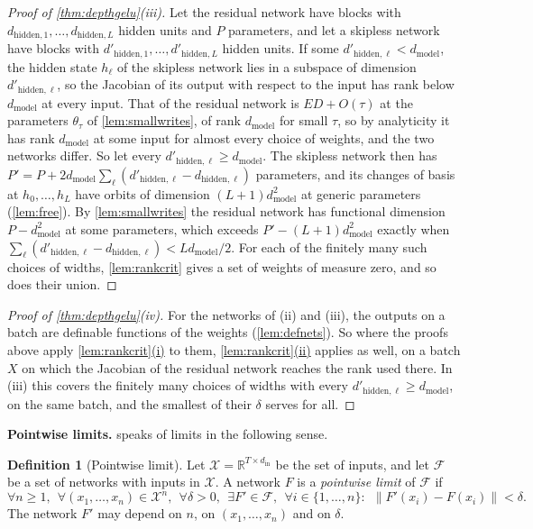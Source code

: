 \documentclass[10pt]{article}
\theoremstyle{definition}
\newtheorem{definition}[theorem]{Definition}
\theoremstyle{remark}
\newcommand{\R}{\mathbb{R}}
\newcommand{\dm}{d_{\mathrm{model}}}
\newcommand{\norm}[1]{\lVert #1\rVert}
\newcommand{\para}[1]{\smallskip\noindent\textbf{#1}\hspace{0.5em}}
\DeclareRobustCommand{\cpref}[2]{\hyperref[#1:#2]{\cref*{#1}(#2)}}
\begin{document}
\begin{proof}[Proof of \cref{thm:depthgelu}(iii)]
Let the residual network have blocks with $d_{\mathrm{hidden},1}, \dots, d_{\mathrm{hidden},L}$ hidden units and $P$ parameters, and let a skipless network have blocks with $d'_{\mathrm{hidden},1}, \dots, d'_{\mathrm{hidden},L}$ hidden units. If some $d'_{\mathrm{hidden},\ell} < \dm$, the hidden state $h_\ell$ of the skipless network lies in a subspace of dimension $d'_{\mathrm{hidden},\ell}$, so the Jacobian of its output with respect to the input has rank below $\dm$ at every input. That of the residual network is $ED + O(\tau)$ at the parameters $\theta_\tau$ of \cref{lem:smallwrites}, of rank $\dm$ for small $\tau$, so by analyticity it has rank $\dm$ at some input for almost every choice of weights, and the two networks differ. So let every $d'_{\mathrm{hidden},\ell} \ge \dm$. The skipless network then has $P' = P + 2\dm\sum_\ell(d'_{\mathrm{hidden},\ell} - d_{\mathrm{hidden},\ell})$ parameters, and its changes of basis at $h_0, \dots, h_L$ have orbits of dimension $(L+1)\dm^2$ at generic parameters (\cref{lem:free}). By \cref{lem:smallwrites} the residual network has functional dimension $P - \dm^2$ at some parameters, which exceeds $P' - (L+1)\dm^2$ exactly when $\sum_\ell(d'_{\mathrm{hidden},\ell} - d_{\mathrm{hidden},\ell}) < L\dm/2$. For each of the finitely many such choices of widths, \cref{lem:rankcrit} gives a set of weights of measure zero, and so does their union.
\end{proof}

\begin{proof}[Proof of \cref{thm:depthgelu}(iv)]
For the networks of (ii) and (iii), the outputs on a batch are definable functions of the weights (\cref{lem:defnets}). So where the proofs above apply \cpref{lem:rankcrit}{i} to them, \cpref{lem:rankcrit}{ii} applies as well, on a batch $X$ on which the Jacobian of the residual network reaches the rank used there. In (iii) this covers the finitely many choices of widths with every $d'_{\mathrm{hidden},\ell} \ge \dm$, on the same batch, and the smallest of their $\delta$ serves for all.
\end{proof}

\para{Pointwise limits.}  speaks of limits in the following sense.

\begin{definition}[Pointwise limit]\label{def:pointwise}
Let $\mathcal X = \R^{T\times d_{\mathrm{in}}}$ be the set of inputs, and let $\mathcal F$ be a set of networks with inputs in $\mathcal X$. A network $F$ is a \emph{pointwise limit} of $\mathcal F$ if
\[
\forall n \ge 1,\ \ \forall (x_1, \dots, x_n) \in \mathcal X^n,\ \ \forall \delta > 0,\ \ \exists F' \in \mathcal F,\ \ \forall i \in \{1, \dots, n\}:\ \ \norm{F'(x_i) - F(x_i)} < \delta .
\]
The network $F'$ may depend on $n$, on $(x_1, \dots, x_n)$ and on $\delta$.
\end{definition}
\end{document}
